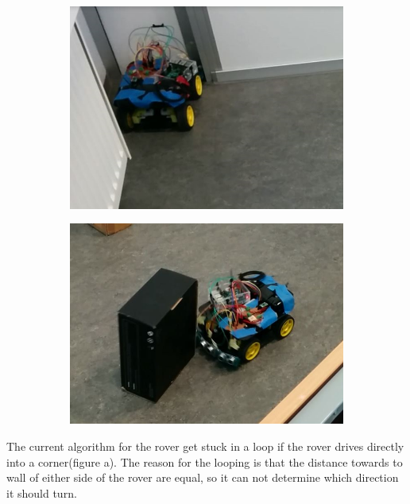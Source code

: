 \clearpage
\begin{figure}[H]
	\centering
	\begin{subfigure}[H]{0.4\textwidth}
		\includegraphics[width=\textwidth]{images/test-stuckincorner.jpg}
		\subcaption{}
	\end{subfigure}%
	\quad
	\begin{subfigure}[H]{0.4\textwidth}
		\includegraphics[width=\textwidth]{images/test-badmeasuringangle.jpg}
		\subcaption{}
	\end{subfigure}
\end{figure}

The current algorithm for the rover get stuck in a loop if the rover drives directly into a corner(figure a). The reason for the looping is that the distance towards to wall of either side of the rover are equal, so it can not determine which direction it should turn.\\